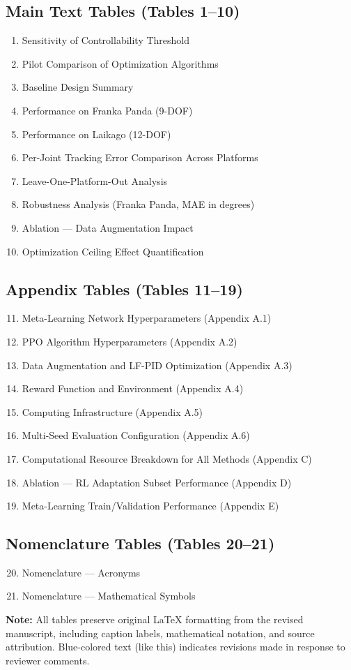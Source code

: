 \documentclass[11pt,a4paper]{article}
\newcommand{\rev}[1]{{\color{blue}#1}}
\begin{document}
\subsection*{Main Text Tables (Tables 1--10)}
\begin{enumerate}
    \item Sensitivity of Controllability Threshold
    \item Pilot Comparison of Optimization Algorithms
    \item Baseline Design Summary
    \item Performance on Franka Panda (9-DOF)
    \item Performance on Laikago (12-DOF)
    \item Per-Joint Tracking Error Comparison Across Platforms
    \item Leave-One-Platform-Out Analysis
    \item Robustness Analysis (Franka Panda, MAE in degrees)
    \item Ablation --- Data Augmentation Impact
    \item Optimization Ceiling Effect Quantification
\end{enumerate}

\subsection*{Appendix Tables (Tables 11--19)}
\begin{enumerate}
    \setcounter{enumi}{10}
    \item Meta-Learning Network Hyperparameters (Appendix A.1)
    \item PPO Algorithm Hyperparameters (Appendix A.2)
    \item Data Augmentation and LF-PID Optimization (Appendix A.3)
    \item Reward Function and Environment (Appendix A.4)
    \item Computing Infrastructure (Appendix A.5)
    \item Multi-Seed Evaluation Configuration (Appendix A.6)
    \item Computational Resource Breakdown for All Methods (Appendix C)
    \item Ablation --- RL Adaptation Subset Performance (Appendix D)
    \item Meta-Learning Train/Validation Performance (Appendix E)
\end{enumerate}

\subsection*{Nomenclature Tables (Tables 20--21)}
\begin{enumerate}
    \setcounter{enumi}{19}
    \item Nomenclature --- Acronyms
    \item Nomenclature --- Mathematical Symbols
\end{enumerate}

\vspace{0.5cm}
\noindent
\textbf{Note:} All tables preserve original LaTeX formatting from the revised manuscript, including caption labels, mathematical notation, and source attribution. Blue-colored text (\rev{like this}) indicates revisions made in response to reviewer comments.
\end{document}
